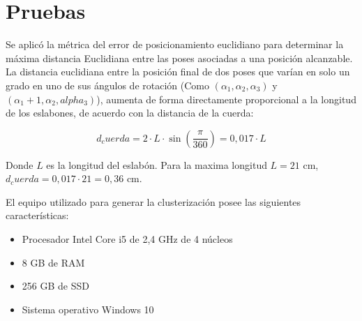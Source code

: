 \section{Pruebas}

Se aplicó la métrica del error de posicionamiento euclidiano para determinar la máxima distancia Euclidiana entre las poses asociadas a una posición alcanzable. La distancia euclidiana entre la posición final de dos poses que varían en solo un grado en uno de sus ángulos de rotación (Como $(\alpha_1,\alpha_2,\alpha_3)$ y $(\alpha_1 + 1, \alpha_2, alpha_3)$), aumenta de forma directamente proporcional a la longitud de los eslabones, de acuerdo con la distancia de la cuerda:

\begin{equation}
	d_cuerda = 2 \cdot L \cdot \sin(\frac{\pi}{360}) = 0,017 \cdot L
\end{equation}

Donde $L$ es la longitud del eslabón. Para la maxima longitud $L = 21$ cm, $d_cuerda = 0,017 \cdot 21 = 0,36$ cm.

El equipo utilizado para generar la clusterización posee las siguientes características:

\begin{itemize}
	\item Procesador Intel Core i5 de 2,4 GHz de 4 núcleos
	\item 8 GB de RAM
	\item 256 GB de SSD
	\item Sistema operativo Windows 10
\end{itemize}

